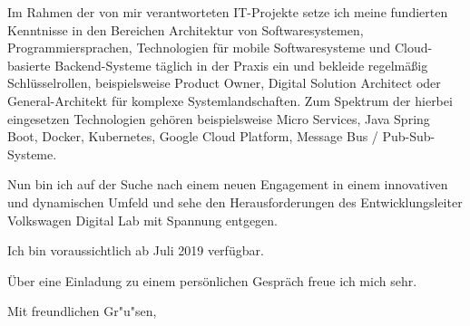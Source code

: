 \documentclass[10pt,a4paper]{dinbrief}
\begin{document}
\begin{letter}
Im Rahmen der von mir verantworteten IT-Projekte setze ich meine fundierten Kenntnisse in den Bereichen Architektur von Softwaresystemen, Programmiersprachen, Technologien für mobile Softwaresysteme und Cloud-basierte Backend-Systeme täglich in der Praxis ein und bekleide regelmäßig Schlüsselrollen, beispielsweise Product Owner, Digital Solution Architect oder General-Architekt für komplexe Systemlandschaften. Zum Spektrum der hierbei eingesetzen Technologien gehören beispielsweise Micro Services, Java Spring Boot, Docker, Kubernetes, Google Cloud Platform, Message Bus / Pub-Sub-Systeme.

Nun bin ich auf der Suche nach einem neuen Engagement in einem innovativen und dynamischen Umfeld und sehe den Herausforderungen des Entwicklungsleiter Volkswagen Digital Lab mit Spannung entgegen.

Ich bin voraussichtlich ab Juli 2019 verfügbar.

Über eine Einladung zu einem persönlichen Gespräch freue ich mich sehr.
\closing{Mit freundlichen Gr"u"sen,}
\end{letter}
\end{document}
